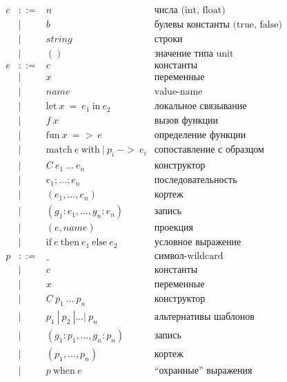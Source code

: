 \documentclass[12pt]{matmex-diploma}
\newcommand \bnfdef  {\mathrel{::=}}
\newcommand \bnfalt  {\mathrel{{|}}}
\begin{document}
\begin{center}
$
\begin{array}{llll}
c & \bnfdef & n & \mbox{числа (int, float)} \\
  & \bnfalt & b & \mbox{булевы константы (true, false)} \\
  & \bnfalt & string & \mbox{строки} \\
  & \bnfalt & () & \mbox{значение типа unit}\\[1ex]
  
e & \bnfdef & c & \mbox{константы} \\
  & \bnfalt & x & \mbox{переменные} \\
  & \bnfalt & name & \mbox{value-name} \\
  & \bnfalt & \mbox{let}~ x ~=~ e_1 ~\mbox{in} ~e_2 & \mbox{локальное связывание} \\
  & \bnfalt & f~x & \mbox{вызов функции} \\
  & \bnfalt & \mbox{fun}~ x ~ => ~ e & \mbox{определение функции} \\
  & \bnfalt & \mbox{match}~ e ~ \mbox{with} ~|~p_i ~->~ e_i & \mbox{сопоставление с образцом} \\
  & \bnfalt & C~e_1 ~\ldots~ e_n & \mbox{конструктор} \\
  & \bnfalt & e_1; \ldots; e_n & \mbox{последовательность} \\
  & \bnfalt & (e_1, \ldots, e_n) & \mbox{кортеж} \\
  & \bnfalt & (g_1:e_1, \ldots, g_n:e_n) & \mbox{запись} \\
  & \bnfalt & (e, name) & \mbox{проекция} \\ 
  & \bnfalt & \mbox{if}~ e ~\mbox{then}~ e_1 ~\mbox{else}~ e_2 & \mbox{условное выражение} \\
  
p & \bnfdef & \_ & \mbox{символ-wildcard} \\
  & \bnfalt & c & \mbox{константы} \\
  & \bnfalt & x & \mbox{переменные} \\
  & \bnfalt & C~p_1 ~\ldots~ p_n & \mbox{конструктор} \\
  & \bnfalt & p_1~|~p_2~|\ldots|~p_n  & \mbox{альтернативы шаблонов} \\
  & \bnfalt & (g_1:p_1, \ldots, g_n:p_n) & \mbox{запись} \\
  & \bnfalt & (p_1, \ldots, p_n) & \mbox{кортеж} \\
  & \bnfalt & p~\mbox{when}~e & \mbox{``охранные'' выражения} \\
\end{array}
$
\captionsetup{type=lstlisting}
\label{tbl:syntaxml}
\end{center}
\end{document}

